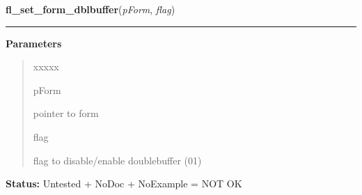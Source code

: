 \hspace{.8\funcindent}\begin{boxedminipage}{\funcwidth}

    \raggedright \textbf{fl\_set\_form\_dblbuffer}(\textit{pForm}, \textit{flag})

    \vspace{-1.5ex}

    \rule{\textwidth}{0.5\fboxrule}
\setlength{\parskip}{2ex}
\setlength{\parskip}{1ex}
      \textbf{Parameters}
      \vspace{-1ex}

      \begin{quote}
        \begin{Ventry}{xxxxx}

          \item[pForm]

          pointer to form

          \item[flag]

          flag to disable/enable doublebuffer (0{\textbar}1)

        \end{Ventry}

      \end{quote}

\textbf{Status:} Untested + NoDoc + NoExample = NOT OK



    \end{boxedminipage}

    \label{xformslib:library:fl_prepare_form_window}

    \vspace{0.5ex}

